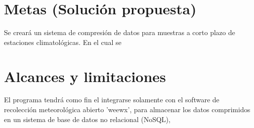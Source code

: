 \section{Metas (Solución propuesta)}

Se creará un sistema de compresión de datos para muestras a corto plazo de estaciones climatológicas. En el cual se

\section{Alcances y limitaciones}

El programa tendrá como fin el integrarse solamente con el software de recolección meteorológica abierto 'weewx', para almacenar los datos comprimidos en un sistema de base de datos no relacional (NoSQL),
